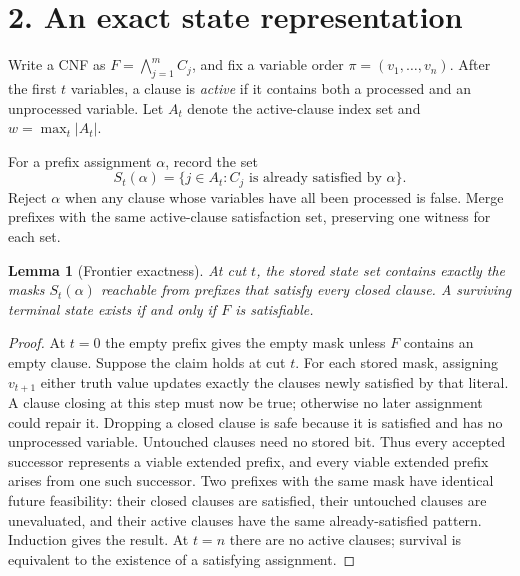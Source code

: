 \documentclass[11pt,a4paper]{article}
\newtheorem{lemma}{Lemma}
\begin{document}
\section*{2. An exact state representation}
Write a CNF as $F=\bigwedge_{j=1}^m C_j$, and fix a variable order $\pi=(v_1,\ldots,v_n)$. After the first $t$ variables, a clause is \emph{active} if it contains both a processed and an unprocessed variable. Let $A_t$ denote the active-clause index set and $w=\max_t|A_t|$.

For a prefix assignment $\alpha$, record the set
\[
S_t(\alpha)=\{j\in A_t:C_j\text{ is already satisfied by }\alpha\}.
\]
Reject $\alpha$ when any clause whose variables have all been processed is false. Merge prefixes with the same active-clause satisfaction set, preserving one witness for each set.

\begin{lemma}[Frontier exactness]
At cut $t$, the stored state set contains exactly the masks $S_t(\alpha)$ reachable from prefixes that satisfy every closed clause. A surviving terminal state exists if and only if $F$ is satisfiable.
\end{lemma}
\begin{proof}
At $t=0$ the empty prefix gives the empty mask unless $F$ contains an empty clause. Suppose the claim holds at cut $t$. For each stored mask, assigning $v_{t+1}$ either truth value updates exactly the clauses newly satisfied by that literal. A clause closing at this step must now be true; otherwise no later assignment could repair it. Dropping a closed clause is safe because it is satisfied and has no unprocessed variable. Untouched clauses need no stored bit. Thus every accepted successor represents a viable extended prefix, and every viable extended prefix arises from one such successor. Two prefixes with the same mask have identical future feasibility: their closed clauses are satisfied, their untouched clauses are unevaluated, and their active clauses have the same already-satisfied pattern. Induction gives the result. At $t=n$ there are no active clauses; survival is equivalent to the existence of a satisfying assignment.
\end{proof}
\end{document}
